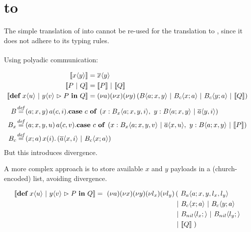 \section{\MonadicJoinCalc to \ActorPiCalc}

The simple translation of \joincalc into \asyncpicalc \cite{fournet_reflexive_1996} cannot be re-used for the translation to \actorpicalc,
since it does not adhere to its typing rules.
\\
\\
Using polyadic communication:

\begin{align}
  \begin{split}
    \encMJtoAP{\jsnd{x}{y}}
    &= \asnd{x}{y} \\
    \encMJtoAP{P \jpar Q}
    &= \encMJtoAP{P} \apar \encMJtoAP{Q} \\
    \encMJtoAP{\jdef{\jrct{\jrcv{x}{u} \jpat \jrcv{y}{v}}{P}}{Q}}
    &= \anew{a}{\anew{x}{\anew*{y}{ \ains{B}{a}{x,y} \apar \ains{B_c}{x}{a} \apar \ains{B_c}{y}{a} \apar \encMJtoAP{Q}}}} \\
  \end{split}
\end{align}
\begin{align}
  \adef*{B}{a}{x,y}{
    \arcv{a}{c,i} . \acse{c}{
       \aalt{x}{\ains{B_x}{a}{x,y,i}},\ 
       \aalt{y}{\ains{B}{a}{x,y} \apar \asnd{a}{y,i}}
     }
  } \\
  \adef*{B_x}{a}{x,y,u}{
    \arcv{a}{c,v} . \acse{c}{
      \aalt{x}{\ains{B_x}{a}{x,y,v} \apar \asnd{a}{x,u}},\ 
      \aalt{y}{\ains{B}{a}{x,y} \apar \encMJtoAP{P}}
    } \\
  }
  \adef*{B_c}{x}{a}{
    \arcv{x}{i} . \parens{\asnd{a}{x,i} \apar \ains{B_c}{x}{a}}
  }
\end{align}
But this introduces divergence.


A more complex approach is to store available $x$ and $y$ payloads in a (church-encoded) list, avoiding divergence.

\begin{align}
  \encMJtoAP{\jdef{\jrct{\jrcv{x}{u} \jpat \jrcv{y}{v}}{P}}{Q}}
  =\
  \anew{a}{\anew{x}{\anew{y}{\anew{l_x}{\anew{l_y}{
    &\left(\ \ains{B_a}{a}{x, y, l_x, l_y} \right. \nonumber \\
    &\apar \ains{B_c}{x}{a} \apar \ains{B_c}{y}{a} \nonumber \\
    &\apar \ains{B_{nil}}{l_x}{} \apar \ains{B_{nil}}{l_y}{} \nonumber \\
    &\apar \encMJtoAP{Q} \left.\right)
  }}}}}
\end{align}

